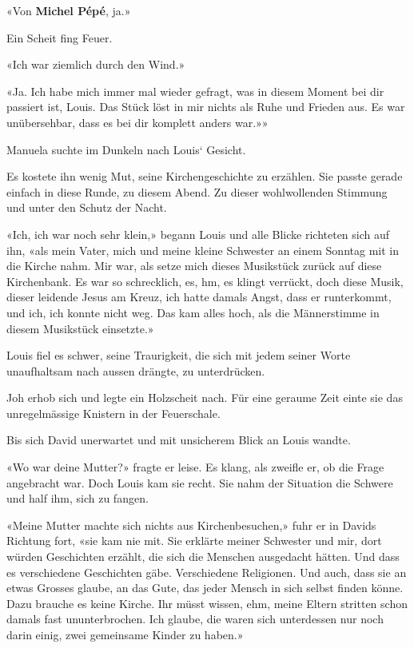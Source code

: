 «Von \textbf{Michel Pépé}, ja.»

Ein Scheit fing Feuer.

«Ich war ziemlich durch den Wind.»

«Ja. Ich habe mich immer mal wieder gefragt, was in diesem Moment bei
dir passiert ist, Louis. Das Stück löst in mir nichts als Ruhe und
Frieden aus. Es war unübersehbar, dass es bei dir komplett anders war.»»

Manuela suchte im Dunkeln nach Louis` Gesicht.

Es kostete ihn wenig Mut, seine Kirchengeschichte zu erzählen. Sie
passte gerade einfach in diese Runde, zu diesem Abend. Zu dieser
wohlwollenden Stimmung und unter den Schutz der Nacht.

«Ich, ich war noch sehr klein,» begann Louis und alle Blicke richteten
sich auf ihn, «als mein Vater, mich und meine kleine Schwester an einem
Sonntag mit in die Kirche nahm. Mir war, als setze mich dieses
Musikstück zurück auf diese Kirchenbank. Es war so schrecklich, es, hm,
es klingt verrückt, doch diese Musik, dieser leidende Jesus am Kreuz,
ich hatte damals Angst, dass er runterkommt, und ich, ich konnte nicht
weg. Das kam alles hoch, als die Männerstimme in diesem Musikstück
einsetzte.»

Louis fiel es schwer, seine Traurigkeit, die sich mit jedem seiner Worte
unaufhaltsam nach aussen drängte, zu unterdrücken.

Joh erhob sich und legte ein Holzscheit nach. Für eine geraume Zeit
einte sie das unregelmässige Knistern in der Feuerschale.

Bis sich David unerwartet und mit unsicherem Blick an Louis wandte.

«Wo war deine Mutter?» fragte er leise. Es klang, als zweifle er, ob die
Frage angebracht war. Doch Louis kam sie recht. Sie nahm der Situation
die Schwere und half ihm, sich zu fangen.

«Meine Mutter machte sich nichts aus Kirchenbesuchen,» fuhr er in Davids
Richtung fort, «sie kam nie mit. Sie erklärte meiner Schwester und mir,
dort würden Geschichten erzählt, die sich die Menschen ausgedacht
hätten. Und dass es verschiedene Geschichten gäbe. Verschiedene
Religionen. Und auch, dass sie an etwas Grosses glaube, an das Gute, das
jeder Mensch in sich selbst finden könne. Dazu brauche es keine Kirche.
Ihr müsst wissen, ehm, meine Eltern stritten schon damals fast
ununterbrochen. Ich glaube, die waren sich unterdessen nur noch darin
einig, zwei gemeinsame Kinder zu haben.»

